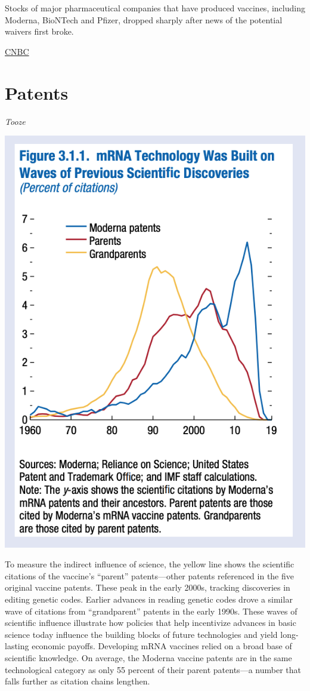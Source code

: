 \documentclass[
]{book}
\begin{document}
Stocks of major pharmaceutical companies that have produced vaccines, including Moderna, BioNTech and Pfizer, dropped sharply after news of the potential waivers first broke.

\href{https://www.cnbc.com/2021/05/05/us-backs-covid-vaccine-intellectual-property-waivers-to-expand-access-to-shots-worldwide.html}{CNBC}

\hypertarget{patents}{%
\chapter{Patents}\label{patents}}

\emph{Tooze}

\includegraphics{fig/moderna_patents_ancesters.png}

To measure the indirect influence of science, the yellow line shows the scientific citations of the vaccine's ``parent'' patents---other patents referenced in the five original vaccine patents. These peak in the early 2000s, tracking discoveries in editing genetic codes. Earlier advances in reading genetic codes drove a similar wave of citations from ``grandparent'' patents in the early 1990s. These waves of scientific influence illustrate how policies that help incentivize advances in basic science today influence the building blocks of future technologies and yield long-lasting economic payoffs. Developing mRNA vaccines relied on a broad base of scientific knowledge. On average, the Moderna vaccine patents are in the same technological category as only 55 percent of their parent patents---a number that falls further as citation chains lengthen.
\end{document}
